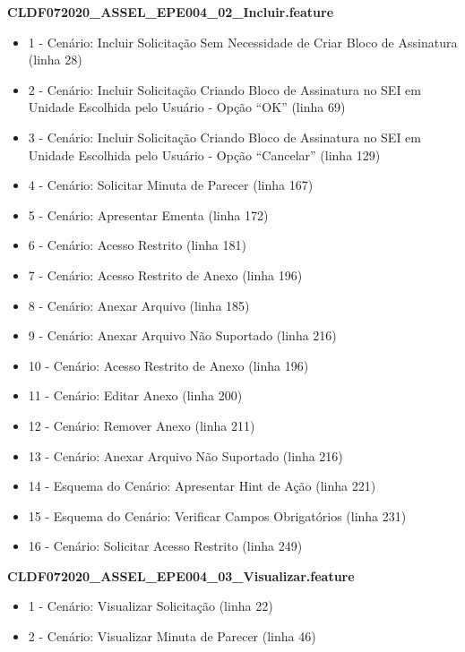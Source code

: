 \textbf{CLDF072020\_ASSEL\_EPE004\_02\_Incluir.feature}
\begin{itemize}
	\item 1 - Cenário: Incluir Solicitação Sem Necessidade de Criar Bloco de Assinatura (linha 28)
	\item 2 - Cenário: Incluir Solicitação Criando Bloco de Assinatura no SEI em Unidade Escolhida pelo Usuário - Opção ``OK'' (linha 69)
	\item 3 - Cenário: Incluir Solicitação Criando Bloco de Assinatura no SEI em Unidade Escolhida pelo Usuário - Opção ``Cancelar'' (linha 129)
	\item 4 - Cenário: Solicitar Minuta de Parecer (linha 167)
	\item 5 - Cenário: Apresentar Ementa (linha 172)
	\item 6 - Cenário: Acesso Restrito (linha 181)
	\item 7 - Cenário: Acesso Restrito de Anexo (linha 196)
	\item 8 - Cenário: Anexar Arquivo (linha 185)
	\item 9 - Cenário: Anexar Arquivo Não Suportado (linha 216)
	\item 10 - Cenário: Acesso Restrito de Anexo (linha 196)
	\item 11 - Cenário: Editar Anexo (linha 200)
	\item 12 - Cenário: Remover Anexo (linha 211)
	\item 13 - Cenário: Anexar Arquivo Não Suportado (linha 216)
	\item 14 - Esquema do Cenário: Apresentar Hint de Ação (linha 221)
	\item 15 - Esquema do Cenário: Verificar Campos Obrigatórios (linha 231)
	\item 16 - Cenário: Solicitar Acesso Restrito (linha 249)
\end{itemize}

\textbf{CLDF072020\_ASSEL\_EPE004\_03\_Visualizar.feature}
\begin{itemize}
	\item 1 - Cenário: Visualizar Solicitação (linha 22)
	\item 2 - Cenário: Visualizar Minuta de Parecer (linha 46)
\end{itemize}

